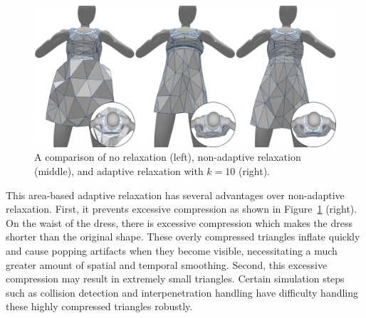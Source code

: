 \documentclass[10pt,journal,compsoc,twoside]{TexInputs/IEEEtran}
\begin{document}
\begin{figure}[t]
  \centering
  \includegraphics[width=1.0\columnwidth]{subelement_compression/no_full_adaptive_compression}
  \caption{A comparison of no relaxation (left), non-adaptive relaxation (middle), and
  adaptive relaxation with $k = 10$ (right).}
  \label{fig:no_full_adaptive}
\end{figure}

This area-based adaptive relaxation has several advantages over non-adaptive relaxation. First,
it prevents excessive compression as shown in Figure~\ref{fig:no_full_adaptive} (right). On the waist of the
dress, there is excessive compression which makes the dress shorter than the original
shape. These overly compressed triangles inflate quickly and cause popping artifacts when
they become visible, necessitating a much greater amount of spatial and temporal smoothing.  Second, this excessive compression may result in extremely small
triangles. Certain simulation steps such as collision
detection and interpenetration handling have difficulty handling these highly compressed triangles robustly.
\end{document}
